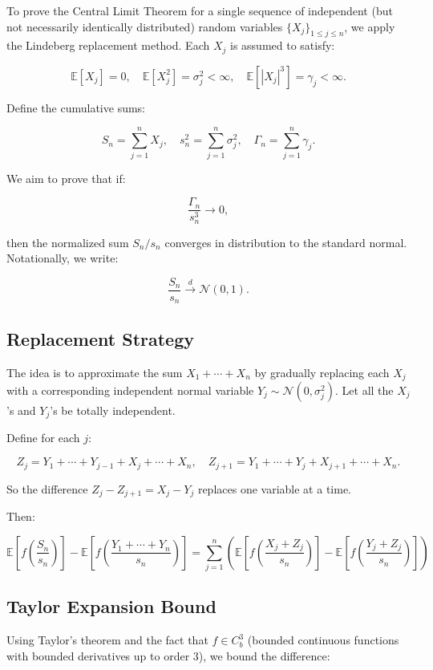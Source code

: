 To prove the Central Limit Theorem for a single sequence of independent (but not necessarily identically distributed) random variables $\{X_j\}_{1 \leq j \leq n}$, we apply the Lindeberg replacement method. Each $X_j$ is assumed to satisfy:

\[
\mathbb{E}[X_j] = 0, \quad \mathbb{E}[X_j^2] = \sigma_j^2 < \infty, \quad \mathbb{E}[|X_j|^3] = \gamma_j < \infty.
\]

Define the cumulative sums:

\[
S_n = \sum_{j=1}^n X_j, \quad s_n^2 = \sum_{j=1}^n \sigma_j^2, \quad \Gamma_n = \sum_{j=1}^n \gamma_j.
\]

We aim to prove that if:

\[
\frac{\Gamma_n}{s_n^3} \to 0,
\]

then the normalized sum $S_n / s_n$ converges in distribution to the standard normal.
Notationally, we write:

\[
\frac{S_n}{s_n} \xrightarrow{d} \mathcal{N}(0,1).
\]

\subsection{Replacement Strategy}

The idea is to approximate the sum $X_1 + \cdots + X_n$ by gradually replacing each $X_j$ with a corresponding independent normal variable $Y_j \sim \mathcal{N}(0, \sigma_j^2)$. Let all the $X_j$'s and $Y_j$'s be totally independent.

Define for each $j$:

\[
Z_j = Y_1 + \cdots + Y_{j-1} + X_j + \cdots + X_n,
\quad
Z_{j+1} = Y_1 + \cdots + Y_j + X_{j+1} + \cdots + X_n.
\]

So the difference $Z_j - Z_{j+1} = X_j - Y_j$ replaces one variable at a time.

Then:

\[
\mathbb{E}\left[ f\left(\frac{S_n}{s_n} \right) \right] - \mathbb{E}\left[ f\left(\frac{Y_1 + \cdots + Y_n}{s_n} \right) \right]
= \sum_{j=1}^n \left(
\mathbb{E}\left[f\left( \frac{X_j + Z_j}{s_n} \right)\right]
- \mathbb{E}\left[f\left( \frac{Y_j + Z_j}{s_n} \right)\right]
\right)
\]

\subsection{Taylor Expansion Bound}

Using Taylor's theorem and the fact that $f \in C^3_b$ (bounded continuous functions with bounded derivatives up to order 3), we bound the difference:

